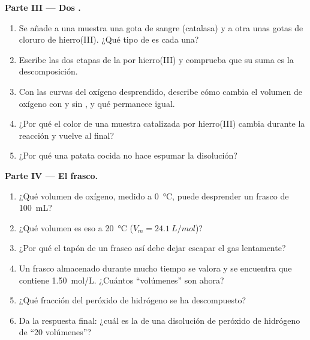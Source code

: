 \begin{problem}
\medskip
\noindent\textbf{Parte III --- Dos .}
\begin{enumerate}[resume]
  \item Se añade a una muestra una gota de sangre (catalasa) y a otra
        unas gotas de cloruro de hierro(III). ¿Qué tipo de  es
        cada una?
  \item Escribe las dos etapas de la  por hierro(III) y
        comprueba que su suma es la descomposición.
  \item Con las curvas del oxígeno desprendido, describe cómo cambia el
        volumen de oxígeno con y sin , y qué permanece igual.
  \item ¿Por qué el color de una muestra catalizada por hierro(III)
        cambia durante la reacción y vuelve al final?
  \item ¿Por qué una patata cocida no hace espumar la disolución?
\end{enumerate}

\medskip
\noindent\textbf{Parte IV --- El frasco.}
\begin{enumerate}[resume]
  \item ¿Qué volumen de oxígeno, medido a \qty{0}{\celsius}, puede
        desprender un frasco de \qty{100}{mL}?
  \item ¿Qué volumen es eso a \qty{20}{\celsius} ($V_m =
        \qty{24.1}{L/mol}$)?
  \item ¿Por qué el tapón de un frasco así debe dejar escapar el gas
        lentamente?
  \item Un frasco almacenado durante mucho tiempo se valora y se encuentra
        que contiene \qty{1.50}{mol/L}. ¿Cuántos ``volúmenes'' son ahora?
  \item ¿Qué fracción del peróxido de hidrógeno se ha descompuesto?
  \item Da la respuesta final: ¿cuál es la  de una
        disolución de peróxido de hidrógeno de ``20 volúmenes''?
\end{enumerate}
\end{problem}
